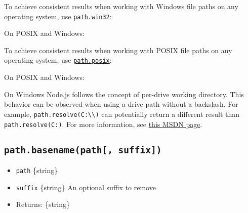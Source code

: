 To achieve consistent results when working with Windows file paths on
any operating system, use \hyperref[pathwin32]{\texttt{path.win32}}:

On POSIX and Windows:

\begin{Shaded}
\begin{Highlighting}[]
\NormalTok{(}\SpecialCharTok{\textbackslash{}\textbackslash{}}\SpecialCharTok{\textbackslash{}\textbackslash{}}\NormalTok{)}\OperatorTok{;}
\end{Highlighting}
\end{Shaded}

To achieve consistent results when working with POSIX file paths on any
operating system, use \hyperref[pathposix]{\texttt{path.posix}}:

On POSIX and Windows:

\begin{Shaded}
\begin{Highlighting}[]
\NormalTok{(}\NormalTok{)}\OperatorTok{;}
\end{Highlighting}
\end{Shaded}

On Windows Node.js follows the concept of per-drive working directory.
This behavior can be observed when using a drive path without a
backslash. For example,
\texttt{path.resolve(\textquotesingle{}C:\textbackslash{}\textbackslash{}\textquotesingle{})}
can potentially return a different result than
\texttt{path.resolve(\textquotesingle{}C:\textquotesingle{})}. For more
information, see
\href{https://docs.microsoft.com/en-us/windows/desktop/FileIO/naming-a-file\#fully-qualified-vs-relative-paths}{this
MSDN page}.

\subsection{\texorpdfstring{\texttt{path.basename(path{[},\ suffix{]})}}{path.basename(path{[}, suffix{]})}}\label{path.basenamepath-suffix}

\begin{itemize}
\tightlist
\item
  \texttt{path} \{string\}
\item
  \texttt{suffix} \{string\} An optional suffix to remove
\item
  Returns: \{string\}
\end{itemize}

